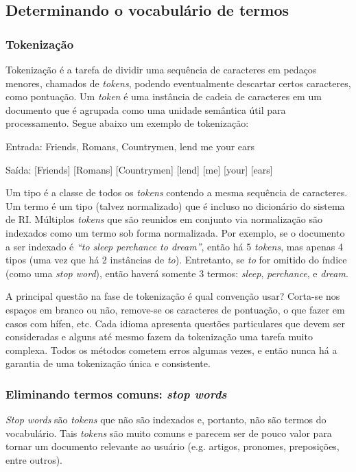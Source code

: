 \subsection{Determinando o vocabulário de termos}

\subsubsection{Tokenização}

Tokenização é a tarefa de dividir uma sequência de caracteres em pedaços menores, chamados de \emph{tokens}, podendo eventualmente descartar certos caracteres, como pontuação. Um \emph{token} é uma instância de cadeia de caracteres em um documento que é agrupada como uma unidade semântica útil para processamento. Segue abaixo um exemplo de tokenização:

Entrada: Friends, Romans, Countrymen, lend me your ears

Saída: [Friends] [Romans] [Countrymen] [lend] [me] [your] [ears]

Um tipo é a classe de todos os \emph{tokens} contendo a mesma sequência de caracteres. Um termo é um tipo (talvez normalizado) que é incluso no dicionário do sistema de RI. Múltiplos \emph{tokens} que são reunidos em conjunto via normalização são indexados como um termo sob forma normalizada. Por exemplo, se o documento a ser indexado é \emph{``to sleep perchance to dream''}, então há 5 \emph{tokens}, mas apenas 4 tipos (uma vez que há 2 instâncias de \emph{to}). Entretanto, se \emph{to} for omitido do índice (como uma \emph{stop word}), então haverá somente 3 termos: \emph{sleep}, \emph{perchance}, e \emph{dream}.

A principal questão na fase de tokenização é qual convenção usar? Corta-se nos espaços em branco ou não, remove-se os caracteres de pontuação, o que fazer em casos com hífen, etc. Cada idioma apresenta questões particulares que devem ser consideradas e alguns até mesmo fazem da tokenização uma tarefa muito complexa. Todos os métodos cometem erros algumas vezes, e então nunca há a garantia de uma tokenização única e consistente.

\subsubsection{Eliminando termos comuns: \emph{stop words}}

\emph{Stop words} são \emph{tokens} que não são indexados e, portanto, não são termos do vocabulário. Tais \emph{tokens} são muito comuns e parecem ser de pouco valor para tornar um documento relevante ao usuário (e.g. artigos, pronomes, preposições, entre outros).

